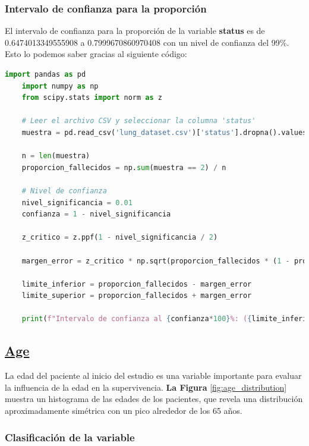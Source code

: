 \documentclass[a4paper,12pt]{article}
\begin{document}
\subsubsection*{Intervalo de confianza para la proporción}

El intervalo de confianza para la proporción de la variable \textbf{status} es de 0.6474013349555908 a 0.7999670860970408 con un nivel de confianza del 99\%. Esto lo podemos saber gracias al siguiente código:

\begin{lstlisting}[language=Python, caption={Código en Python para calcular el intervalo de confianza},label={2st:intervalo_confianza_normal}]
    import pandas as pd
    import numpy as np
    from scipy.stats import norm as z
    
    # Leer el archivo CSV y seleccionar la columna 'status'
    muestra = pd.read_csv('lung_dataset.csv')['status'].dropna().values
    
    n = len(muestra)
    proporcion_fallecidos = np.sum(muestra == 2) / n
    
    # Nivel de confianza
    nivel_significancia = 0.01
    confianza = 1 - nivel_significancia
    
    z_critico = z.ppf(1 - nivel_significancia / 2)

    margen_error = z_critico * np.sqrt(proporcion_fallecidos * (1 - proporcion_fallecidos) / n)
    
    limite_inferior = proporcion_fallecidos - margen_error
    limite_superior = proporcion_fallecidos + margen_error

    print(f"Intervalo de confianza al {confianza*100}%: ({limite_inferior}, {limite_superior})")

\end{lstlisting}

    \subsection*{\underline{Age}}

    La edad del paciente al inicio del estudio es una variable importante para evaluar la influencia de la edad en la supervivencia. \textbf{La Figura }\ref{fig:age_distribution} muestra un histograma de las edades de los pacientes, que revela una distribución aproximadamente simétrica con un pico alrededor de los 65 años.
	
    \subsubsection*{Clasificación de la variable}
\end{document}
